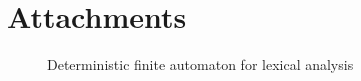 \documentclass[a4paper, 11pt]{article}
\begin{document}
\newpage
\section{Attachments}
\begin{figure}[ht]
    \begin{center}
        \caption{Deterministic finite automaton for lexical analysis}
        \label{automaton}
    \end{center}
\end{figure}
\end{document}
